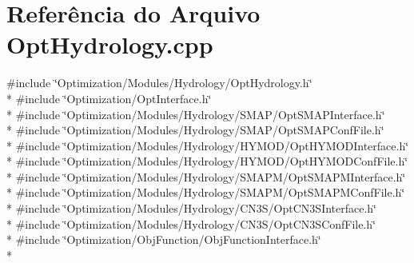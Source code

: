 \section{Referência do Arquivo Opt\+Hydrology.\+cpp}
\label{_opt_hydrology_8cpp}
{\ttfamily \#include \char`\"{}Optimization/\+Modules/\+Hydrology/\+Opt\+Hydrology.\+h\char`\"{}}\\*
{\ttfamily \#include \char`\"{}Optimization/\+Opt\+Interface.\+h\char`\"{}}\\*
{\ttfamily \#include \char`\"{}Optimization/\+Modules/\+Hydrology/\+S\+M\+A\+P/\+Opt\+S\+M\+A\+P\+Interface.\+h\char`\"{}}\\*
{\ttfamily \#include \char`\"{}Optimization/\+Modules/\+Hydrology/\+S\+M\+A\+P/\+Opt\+S\+M\+A\+P\+Conf\+File.\+h\char`\"{}}\\*
{\ttfamily \#include \char`\"{}Optimization/\+Modules/\+Hydrology/\+H\+Y\+M\+O\+D/\+Opt\+H\+Y\+M\+O\+D\+Interface.\+h\char`\"{}}\\*
{\ttfamily \#include \char`\"{}Optimization/\+Modules/\+Hydrology/\+H\+Y\+M\+O\+D/\+Opt\+H\+Y\+M\+O\+D\+Conf\+File.\+h\char`\"{}}\\*
{\ttfamily \#include \char`\"{}Optimization/\+Modules/\+Hydrology/\+S\+M\+A\+P\+M/\+Opt\+S\+M\+A\+P\+M\+Interface.\+h\char`\"{}}\\*
{\ttfamily \#include \char`\"{}Optimization/\+Modules/\+Hydrology/\+S\+M\+A\+P\+M/\+Opt\+S\+M\+A\+P\+M\+Conf\+File.\+h\char`\"{}}\\*
{\ttfamily \#include \char`\"{}Optimization/\+Modules/\+Hydrology/\+C\+N3\+S/\+Opt\+C\+N3\+S\+Interface.\+h\char`\"{}}\\*
{\ttfamily \#include \char`\"{}Optimization/\+Modules/\+Hydrology/\+C\+N3\+S/\+Opt\+C\+N3\+S\+Conf\+File.\+h\char`\"{}}\\*
{\ttfamily \#include \char`\"{}Optimization/\+Obj\+Function/\+Obj\+Function\+Interface.\+h\char`\"{}}\\*
